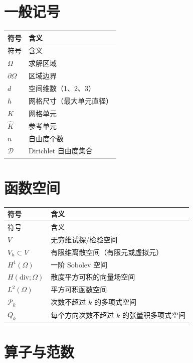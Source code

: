 \documentclass[UTF8,11pt,oneside]{ctexbook}
\theoremstyle{definition}
\theoremstyle{plain}
\begin{document}
\section{一般记号}

\begin{longtable}{@{}ll@{}}
\toprule
符号 & 含义 \\
\midrule
\endfirsthead
\toprule
符号 & 含义 \\
\midrule
\endhead
$\Omega$ & 求解区域 \\
$\partial\Omega$ & 区域边界 \\
$d$ & 空间维数（1、2、3） \\
$h$ & 网格尺寸（最大单元直径） \\
$K$ & 网格单元 \\
$\hat K$ & 参考单元 \\
$n$ & 自由度个数 \\
$\mathcal{D}$ & Dirichlet 自由度集合 \\
\bottomrule
\end{longtable}

\section{函数空间}

\begin{longtable}{@{}ll@{}}
\toprule
符号 & 含义 \\
\midrule
\endfirsthead
\toprule
符号 & 含义 \\
\midrule
\endhead
$V$ & 无穷维试探/检验空间 \\
$V_h\subset V$ & 有限维离散空间（有限元或虚拟元） \\
$H^1(\Omega)$ & 一阶 Sobolev 空间 \\
$H(\mathrm{div};\Omega)$ & 散度平方可积的向量场空间 \\
$L^2(\Omega)$ & 平方可积函数空间 \\
$\mathcal{P}_k$ & 次数不超过 $k$ 的多项式空间 \\
$Q_k$ & 每个方向次数不超过 $k$ 的张量积多项式空间 \\
\bottomrule
\end{longtable}

\section{算子与范数}
\end{document}
